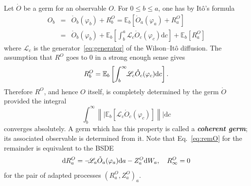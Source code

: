 \documentclass[reprint,aps]{revtex4-2}
\newcommand{\mathd}{\mathrm{d}}
\newcommand{\tmtextbf}[1]{\textbf{{{#1}}}}
\newcommand{\tmtextit}[1]{\textit{{{#1}}}}
\newcommand{\bbE}{\mathbb{E}}
\begin{document}
Let $\ring{O}$ be a germ for an observable $O$. For $0 \leqslant b \leqslant
a$, one has by It{\^o}'s formula
\[ \begin{array}{lll}
     O_b & = & \ring{O}_b (\varphi_b) + R^O_b = \bbE_b  [\ring{O}_a
     (\varphi_a) + R^O_a]\\
     & = & \ring{O}_b (\varphi_b) + \bbE_b \left[ \int_b^a \mathscr{L}_c
     \ring{O}_c (\varphi_c) \mathd c \right] + \bbE_b [R^O_a]
   \end{array} \]
where $\mathscr{L}_c$ is the generator~\eqref{eq:generator} of the
Wilson--It{\^o} diffusion. The assumption that $R^O$ goes to $0$ in a strong
enough sense gives
\begin{equation}
  R^O_b = \bbE_b \left[ \int_b^{\infty} \hspace{-0.1cm} \mathscr{L}_c
  \ring{O}_c (\varphi_c) \mathd c \right] . \label{eq:remO}
\end{equation}
Therefore $R^O$, and hence $O$ itself, is completely determined by the germ
$\ring{O}$ provided the integral
\[ \int_b^{\infty} \left\|| \bbE_b [\mathscr{L}_c \ring{O}_c (\varphi_c)]
   \right\|| \mathd c \]
converges absolutely. A germ which has this property is called a
\tmtextit{\tmtextbf{coherent germ}}; its associated observable is determined
from it. Note that Eq.~\eqref{eq:remO} for the remainder is equivalent to the
BSDE
\begin{equation}
  \mathd R^O_a = - \hspace{-0.1cm} \mathscr{L}_a \ring{O}_a (\varphi_a) \mathd
  a - Z^O_a \mathd W_a, \quad R^O_{\infty} = 0 \label{eq:bsde-O}
\end{equation}
for the pair of adapted processes $(R^O_a, Z^O_a)_a$.

\
\end{document}
